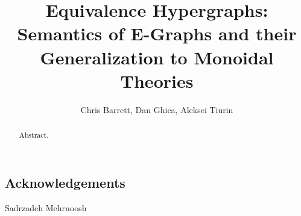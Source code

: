 \documentclass
  [ acmsmall
  , pdftex
  , dvipsnames
  , review
  , nonacm
  , screen
  , authordraft
  ]{acmart}
\title{Equivalence Hypergraphs: Semantics of E-Graphs and their Generalization to Monoidal Theories}
\author{Chris Barrett, Dan Ghica, Aleksei Tiurin}
\begin{document}
\begin{abstract}
Abstract.
\end{abstract}

\maketitle


% 








\subsection*{Acknowledgements}
Sadrzadeh Mehrnoosh 

\clearpage


\end{document}
